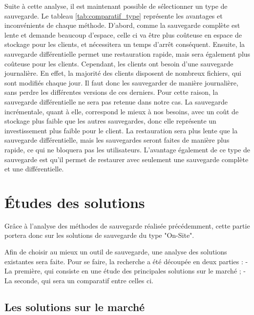 \documentclass[pfe]{tnreport} %
\begin{document}
Suite à cette analyse, il est maintenant possible de sélectionner un type de sauvegarde. \newline
Le tableau \ref{tab:comparatif_type} représente les avantages et inconvénients de chaque méthode. \newline
D'abord, comme la sauvegarde complète est lente et demande beaucoup d'espace, celle ci va être plus coûteuse en espace de stockage pour les clients, et nécessitera un temps d'arrêt conséquent. \newline
Ensuite, la sauvegarde différentielle permet une restauration rapide, mais sera également plus coûteuse pour les clients. Cependant, les clients ont besoin d'une sauvegarde journalière. \newline
En effet, la majorité des clients disposent de nombreux fichiers, qui sont modifiés chaque jour. Il faut donc les sauvegarder de manière journalière, sans perdre les différentes versions de ces derniers. Pour cette raison, la sauvegarde différentielle ne sera pas retenue dans notre cas. \newline
La sauvegarde incrémentale, quant à elle, correspond le mieux à nos besoins, avec un coût de stockage plus faible que les autres sauvegardes, donc elle représente un investissement plus faible pour le client. La restauration sera plus lente que la sauvegarde différentielle, mais les sauvegardes seront faites de manière plus rapide, ce qui ne bloquera pas les utilisateurs. \newline L'avantage également de ce type de sauvegarde est qu'il permet de restaurer avec seulement une sauvegarde complète et une différentielle. \newpage
\section{Études des solutions}

Grâce à l'analyse des méthodes de sauvegarde réalisée précédemment, cette partie portera donc sur les solutions de sauvegarde du type "On-Site".

Afin de choisir au mieux un outil de sauvegarde, une analyse des solutions existantes sera faite. \newline
Pour se faire, la recherche a été découpée en deux parties : \newline
- La première, qui consiste en une étude des principales solutions sur le marché ;\newline
- La seconde, qui sera un comparatif entre celles ci.

\subsection{Les solutions sur le marché}
\end{document}
